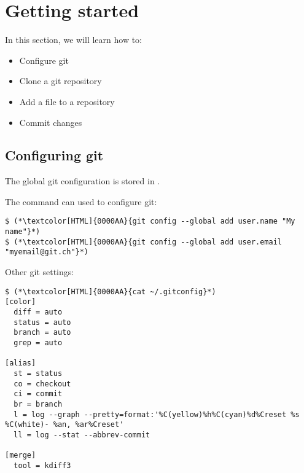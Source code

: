\section{Getting started}
\begin{frame}[fragile]
  \slidetitle

  In this section, we will learn how to:
  \begin{itemize}
    \item Configure git
    \item Clone a git repository
    \item Add a file to a repository
    \item Commit changes
  \end{itemize}
\end{frame}

\subsection{Configuring git}
\begin{frame}[fragile]
  \subslidetitle
  The global git configuration is stored in .
  \\
  \vspace{1em}

  The command  can used to configure git:
  \begin{lstlisting}
$ (*\textcolor[HTML]{0000AA}{git config --global add user.name "My name"}*)
$ (*\textcolor[HTML]{0000AA}{git config --global add user.email "myemail@git.ch"}*)
  \end{lstlisting}

  Other git settings:
  \begin{lstlisting}[basicstyle=\small\ttfamily\bfseries]
$ (*\textcolor[HTML]{0000AA}{cat ~/.gitconfig}*)
[color]
  diff = auto
  status = auto
  branch = auto
  grep = auto

[alias]
  st = status
  co = checkout
  ci = commit
  br = branch
  l = log --graph --pretty=format:'%C(yellow)%h%C(cyan)%d%Creset %s %C(white)- %an, %ar%Creset'
  ll = log --stat --abbrev-commit

[merge]
  tool = kdiff3
  \end{lstlisting}
\end{frame}


